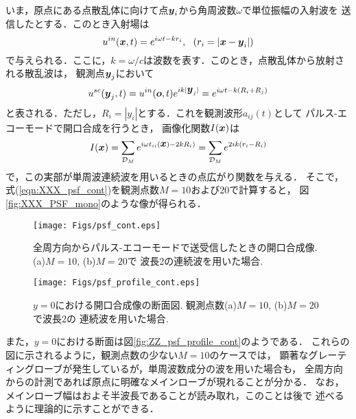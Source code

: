 いま，原点にある点散乱体に向けて点$\mbox{\boldmath $y$}_i$から角周波数$\omega$で単位振幅の入射波を
送信したとする．このとき入射場は
\begin{equation}
	u^{in}(\fat{x},t)=e^{i\omega t-kr_i}, \ \ (r_i=\left| \fat{x}-\fat{y}_i\right|)
	\label{eqn:XXX_10}
\end{equation}
で与えられる．ここに，$k=\omega/c$は波数を表す．このとき，点散乱体から放射される散乱波は，
観測点$\mbox{\boldmath $y$}_j$において
\begin{equation}
	u^{sc}(\mbox{\boldmath $y$}_j,t)=
	u^{in}(\mbox{\boldmath $o$},t)e^{i k|\mbox{\boldmath $y$}_j|}
	=e^{i\omega t -k(R_i+R_j)}
	\label{eqn:XXX_11}
\end{equation}
と表される．ただし，$R_i=\left| y_i\right|$とする．これを観測波形$a_{ij}(t)$として
パルス-エコーモードで開口合成を行うとき，
画像化関数$I(\mbox{\boldmath $x$})$は
\begin{equation}
	I(\mbox{\boldmath $x$}) =
	\sum_{{\cal D}_M} 
		e^{i\omega t_{ii}(\mbox{\boldmath $x$}) -2kR_i)}
	=
	\sum_{{\cal D}_M} 
		e^{2ik(r_i-R_i)}
	\label{eqn:XXX_PSF_mono}
\end{equation}
で，この実部が単周波連続波を用いるときの点広がり関数を与える．
そこで，式(\ref{eqn:XXX_psf_cont})を観測点数$M=10$および20で計算すると，
図\ref{fig:XXX_PSF_mono}のような像が得られる．
\begin{figure}[h]
	\begin{center}
	\texttt{[image: Figs/psf\_cont.eps]} 
	\end{center}
	\caption{全周方向からパルス-エコーモードで送受信したときの開口合成像.(a)$M=10$, (b)$M=20$で
	波長2の連続波を用いた場合.} 
	\label{fig:XXX_psf_cont}
\end{figure}
\begin{figure}[h]
	\begin{center}
	\texttt{[image: Figs/psf\_profile\_cont.eps]} 
	\end{center}
	\caption{$y=0$における開口合成像の断面図. 観測点数(a)$M=10$, (b)$M=20$で波長2の
	連続波を用いた場合.}
	\label{fig:XXX_psf_profile_cont}
\end{figure}
また，$y=0$における断面は図\ref{fig:ZZ_psf_profile_cont}のようである．
これらの図に示されるように，観測点数の少ない$M=10$のケースでは，
顕著なグレーティングローブが発生しているが，単周波数成分の波を用いた場合も，
全周方向からの計測であれば原点に明確なメインローブが現れることが分かる．
なお，メインローブ幅はおよそ半波長であることが読み取れ，このことは後で
述べるように理論的に示すことができる．

